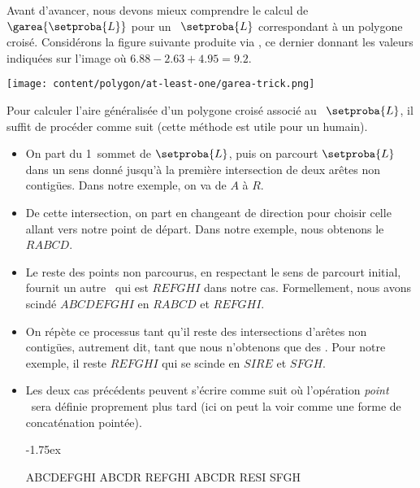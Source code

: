 

Avant d'avancer, nous devons mieux comprendre le calcul de $\garea{\setproba{L}}$ pour un \ncycle\ $\setproba{L}$ correspondant à un polygone croisé.
Considérons la figure suivante produite via \geogebra, ce dernier donnant les valeurs indiquées sur l'image où $\num{6.88} - \num{2.63} + \num{4.95} = \num{9.2}$.


\begin{center}
    \texttt{[image: content/polygon/at-least-one/garea-trick.png]}
\end{center}


Pour calculer l'aire généralisée d'un polygone croisé associé au \ncycle\ $\setproba{L}$, il suffit de procéder comme suit (cette méthode est utile pour un humain).
%
\begin{itemize}
    \item On part du 1\iere\ sommet de $\setproba{L}$, puis on parcourt $\setproba{L}$ dans un sens donné jusqu'à la première intersection de deux arêtes non contigües. Dans notre exemple, on va de $A$ à $R$.


    \item De cette intersection, on part en changeant de direction pour choisir celle allant vers notre point de départ. Dans notre exemple, nous obtenons le  $RABCD$.


    \item Le reste des points non parcourus, en respectant le sens de parcourt initial, fournit un autre \kcycle\ qui est $REFGHI$ dans notre cas. Formellement, nous avons scindé $ABCDEFGHI$ en $RABCD$ et $REFGHI$.


    \item On répète ce processus tant qu'il reste des intersections d'arêtes non contigües, autrement dit, tant que nous n'obtenons que des \kgones.
    Pour notre exemple, il reste $REFGHI$ qui se scinde en $SIRE$ et $SFGH$.


    \item Les deux cas précédents peuvent s'écrire comme suit où l'opération \og \emph{point} \fg\ sera définie proprement plus tard (ici on peut la voir comme une forme de concaténation pointée).

    \smallskip
    \noindent\kern-1.75ex
    \begin{stepcalc}[style=ar*]
    	ABCDEFGHI
		ABCDR \cdot REFGHI
		ABCDR \cdot RESI \cdot SFGH
    \end{stepcalc}


\end{itemize}
